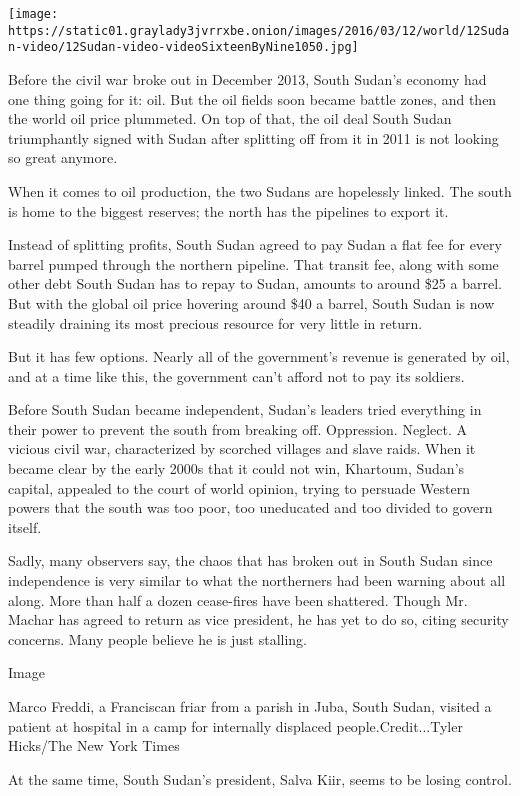 \texttt{[image: https://static01.graylady3jvrrxbe.onion/images/2016/03/12/world/12Sudan-video/12Sudan-video-videoSixteenByNine1050.jpg]}

Before the civil war broke out in December 2013, South Sudan's economy
had one thing going for it: oil. But the oil fields soon became battle
zones, and then the world oil price plummeted. On top of that, the oil
deal South Sudan triumphantly signed with Sudan after splitting off from
it in 2011 is not looking so great anymore.

When it comes to oil production, the two Sudans are hopelessly linked.
The south is home to the biggest reserves; the north has the pipelines
to export it.

Instead of splitting profits, South Sudan agreed to pay Sudan a flat fee
for every barrel pumped through the northern pipeline. That transit fee,
along with some other debt South Sudan has to repay to Sudan, amounts to
around \$25 a barrel. But with the global oil price hovering around \$40
a barrel, South Sudan is now steadily draining its most precious
resource for very little in return.

But it has few options. Nearly all of the government's revenue is
generated by oil, and at a time like this, the government can't afford
not to pay its soldiers.

Before South Sudan became independent, Sudan's leaders tried everything
in their power to prevent the south from breaking off. Oppression.
Neglect. A vicious civil war, characterized by scorched villages and
slave raids. When it became clear by the early 2000s that it could not
win, Khartoum, Sudan's capital, appealed to the court of world opinion,
trying to persuade Western powers that the south was too poor, too
uneducated and too divided to govern itself.

Sadly, many observers say, the chaos that has broken out in South Sudan
since independence is very similar to what the northerners had been
warning about all along. More than half a dozen cease-fires have been
shattered. Though Mr. Machar has agreed to return as vice president, he
has yet to do so, citing security concerns. Many people believe he is
just stalling.

Image

Marco Freddi, a Franciscan friar from a parish in Juba, South Sudan,
visited a patient at hospital in a camp for internally displaced
people.Credit...Tyler Hicks/The New York Times

At the same time, South Sudan's president, Salva Kiir, seems to be
losing control.

